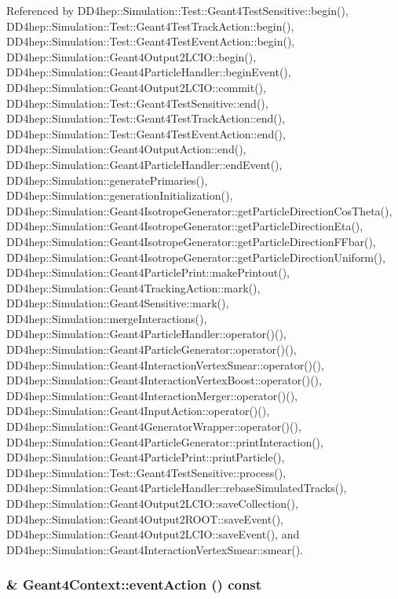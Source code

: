 Referenced by DD4hep::Simulation::Test::Geant4TestSensitive::begin(), DD4hep::Simulation::Test::Geant4TestTrackAction::begin(), DD4hep::Simulation::Test::Geant4TestEventAction::begin(), DD4hep::Simulation::Geant4Output2LCIO::begin(), DD4hep::Simulation::Geant4ParticleHandler::beginEvent(), DD4hep::Simulation::Geant4Output2LCIO::commit(), DD4hep::Simulation::Test::Geant4TestSensitive::end(), DD4hep::Simulation::Test::Geant4TestTrackAction::end(), DD4hep::Simulation::Test::Geant4TestEventAction::end(), DD4hep::Simulation::Geant4OutputAction::end(), DD4hep::Simulation::Geant4ParticleHandler::endEvent(), DD4hep::Simulation::generatePrimaries(), DD4hep::Simulation::generationInitialization(), DD4hep::Simulation::Geant4IsotropeGenerator::getParticleDirectionCosTheta(), DD4hep::Simulation::Geant4IsotropeGenerator::getParticleDirectionEta(), DD4hep::Simulation::Geant4IsotropeGenerator::getParticleDirectionFFbar(), DD4hep::Simulation::Geant4IsotropeGenerator::getParticleDirectionUniform(), DD4hep::Simulation::Geant4ParticlePrint::makePrintout(), DD4hep::Simulation::Geant4TrackingAction::mark(), DD4hep::Simulation::Geant4Sensitive::mark(), DD4hep::Simulation::mergeInteractions(), DD4hep::Simulation::Geant4ParticleHandler::operator()(), DD4hep::Simulation::Geant4ParticleGenerator::operator()(), DD4hep::Simulation::Geant4InteractionVertexSmear::operator()(), DD4hep::Simulation::Geant4InteractionVertexBoost::operator()(), DD4hep::Simulation::Geant4InteractionMerger::operator()(), DD4hep::Simulation::Geant4InputAction::operator()(), DD4hep::Simulation::Geant4GeneratorWrapper::operator()(), DD4hep::Simulation::Geant4ParticleGenerator::printInteraction(), DD4hep::Simulation::Geant4ParticlePrint::printParticle(), DD4hep::Simulation::Test::Geant4TestSensitive::process(), DD4hep::Simulation::Geant4ParticleHandler::rebaseSimulatedTracks(), DD4hep::Simulation::Geant4Output2LCIO::saveCollection(), DD4hep::Simulation::Geant4Output2ROOT::saveEvent(), DD4hep::Simulation::Geant4Output2LCIO::saveEvent(), and DD4hep::Simulation::Geant4InteractionVertexSmear::smear().\hypertarget{class_d_d4hep_1_1_simulation_1_1_geant4_context_a9e24c99880047718c2c9440567b214aa}{
\subsubsection[{eventAction}]{ \& Geant4Context::eventAction () const}}
\label{class_d_d4hep_1_1_simulation_1_1_geant4_context_a9e24c99880047718c2c9440567b214aa}


